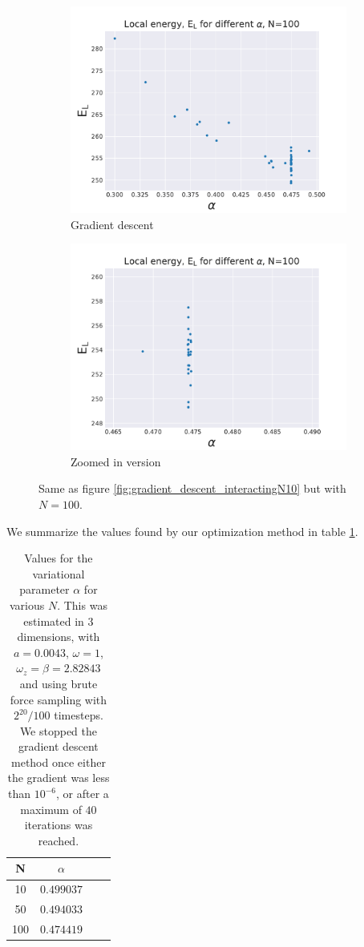 \documentclass[a4paper, 10pt]{article}
\begin{document}
		\begin{figure}[ht!]
			\centering
			\centering
			\begin{subfigure}{.5\textwidth}
				\centering
				\includegraphics[width=.8\linewidth]{../Results/E_v_alpha_gradientN100.pdf}
				\caption{Gradient descent}
			\end{subfigure}%
			\begin{subfigure}{.5\textwidth}
				\centering
				\includegraphics[width=.8\linewidth]{../Results/E_v_alpha_gradientN100Zoom.pdf}
				\caption{Zoomed in version}
			\end{subfigure}
			\caption{Same as figure \ref{fig:gradient_descent_interactingN10} but with $N=100$. }\label{fig:gradient_descent_interactingN100}
		\end{figure}
		\pagebreak
		\newpage
		We summarize the values found by our optimization method in table \ref{tab:correct_alpha_interacting}.
			\begin{table}[ht!]
			\caption{Values for the variational parameter $\alpha$ for various $N$. This was estimated in 3 dimensions, with $a=0.0043$, $\omega=1$, $\omega_z=\beta=2.82843$ and using brute force sampling with $2^{20}/100$ timesteps. We stopped the gradient descent method once either the gradient was less than $10^{-6}$, or after a maximum of $40$ iterations was reached.}\label{tab:correct_alpha_interacting}
				\centering
				\begin{tabular}{cccc}
					N & $\alpha$\\
					\hline
					10 & $0.499037$\\
					50 &$0.494033$\\ 
					100 & $0.474419$
				\end{tabular}
		\end{table}
\end{document}
